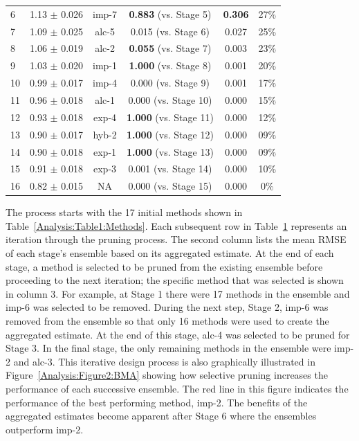 \documentclass[journal=jpcbfk, manuscript=article]{achemso}
\newcommand{\+}[1]{\ensuremath{\mathbf{#1}}}
\newcommand{\rev}[1]{#1}
\begin{document}
\begin{table}[t!]
{\begin{tabular}{l|c|c|c|c|c}
		 6 & 1.13 $\pm$ 0.026 & imp-7 & \textbf{0.883}  (vs. Stage 5)& \textbf{0.306} & 27\%\\
		 7 & 1.09 $\pm$ 0.025 & alc-5 & 0.015  (vs. Stage 6) &  0.027 & 25\%\\
		 8 & 1.06 $\pm$ 0.019 & alc-2 & \textbf{0.055}  (vs. Stage 7) & 0.003 & 23\%\\
		 9 & 1.03 $\pm$ 0.020 & imp-1 & \textbf{1.000}  (vs. Stage 8)& 0.001 & 20\%\\
		 10 & 0.99 $\pm$ 0.017 & imp-4 & 0.000  (vs. Stage 9)& 0.001 & 17\%\\
		 11 & 0.96 $\pm$ 0.018 & alc-1 & 0.000  (vs. Stage 10) & 0.000 & 15\%\\														
		 12 & 0.93 $\pm$ 0.018 & exp-4 &  \textbf{1.000}  (vs. Stage 11)& 0.000 & 12\%\\
		 13 & 0.90 $\pm$ 0.017 & hyb-2 & \textbf{1.000}  (vs. Stage 12) &0.000 &  09\%\\															
		 14 & 0.90 $\pm$ 0.018 & exp-1 & \textbf{1.000}   (vs. Stage 13)& 0.000 & 09\%\\															
		 15 & 0.91 $\pm$ 0.018 & exp-3 &   0.001 (vs. Stage 14)&  0.000  & 10\%\\																
		 16 & 0.82 $\pm$ 0.015 & NA  & 0.000   (vs. Stage 15)&0.000 &  0\%\\
		\hline
		\hline
	\end{tabular}}
	\label{Analysis:Table2:BMA}
\end{table}
The process starts with the 17 initial methods shown in Table~\ref{Analysis:Table1:Methods}.
Each subsequent row in Table~\ref{Analysis:Table2:BMA} represents an iteration through the pruning process.
The second column lists the mean \rev{RMSE} of each stage's ensemble based on its aggregated estimate.
At the end of each stage, a method is selected to be pruned from the existing ensemble before proceeding to the next iteration; the specific method that was selected is shown in column 3.
For example, at Stage 1 there were 17 methods in the ensemble and imp-6 was selected to be removed.
During the next step, Stage 2, imp-6 \rev{was} removed from the ensemble \rev{so that only 16 methods were used to create the aggregated estimate}.
At the end of this stage, alc-4 was selected to be pruned for Stage 3.
In the final stage, the only remaining methods in the ensemble were imp-2 and alc-3.
This iterative design process is also graphically illustrated in Figure~\ref{Analysis:Figure2:BMA} showing how selective pruning increases the performance of each successive ensemble.
The red line in this figure indicates the performance of the best performing method, imp-2.
The benefits of the aggregated estimates become apparent after Stage 6 where the ensembles outperform imp-2.
\end{document}
